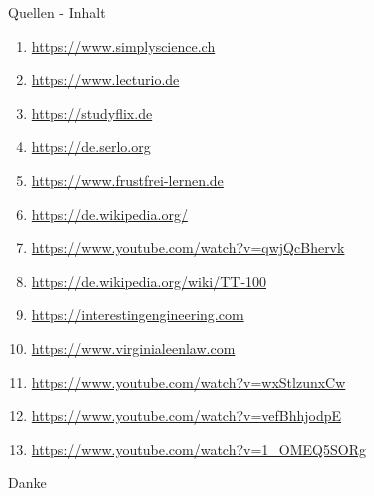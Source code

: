 \documentclass{beamer}
\begin{document}
\begin{frame}{Quellen - Inhalt}
\begin{enumerate}
\item		
\href{https://www.simplyscience.ch/kids/wissen/dna-was-ist-das
}{https://www.simplyscience.ch}	
\item
\href{https://www.lecturio.de/magazin/dna/}{https://www.lecturio.de}
\item
\href{https://studyflix.de/biologie/dna-desoxyribonukleinsaure-2444}{https://studyflix.de}
\item
\href{https://de.serlo.org/biologie/70762/dna-was-ist-das}{https://de.serlo.org}
\item
\href{https://www.frustfrei-lernen.de/biologie/dna-dns-aufbau-struktur.html}{https://www.frustfrei-lernen.de}
\item
\href{https://de.wikipedia.org/wiki/DNA-Computer}{https://de.wikipedia.org/}
\item
\href{https://www.youtube.com/watch?v=qwjQcBhervk}{https://www.youtube.com/watch?v=qwjQcBhervk}
\item
\href{https://de.wikipedia.org/wiki/TT-100}{https://de.wikipedia.org/wiki/TT-100}
\item
\href{https://interestingengineering.com/what-is-dna-computing-how-does-it-work-and-why-its-such-a-big-deal}{https://interestingengineering.com}
\item
\href{https://www.virginialeenlaw.com/help/readers-ask-how-much-data-can-be-stored-in-dna.html}{https://www.virginialeenlaw.com}
\item
\href{https://www.youtube.com/watch?v=wxStlzunxCw}{https://www.youtube.com/watch?v=wxStlzunxCw}
\item
\href{https://www.youtube.com/watch?v=vefBhhjodpE}{https://www.youtube.com/watch?v=vefBhhjodpE}
\item
\href{https://www.youtube.com/watch?v=1_OMEQ5SORg&t=156s}{https://www.youtube.com/watch?v=1\_OMEQ5SORg}

\end{enumerate}
\end{frame}

\begin{frame}{}
	\centering \Large
	Danke
\end{frame}
\end{document}

